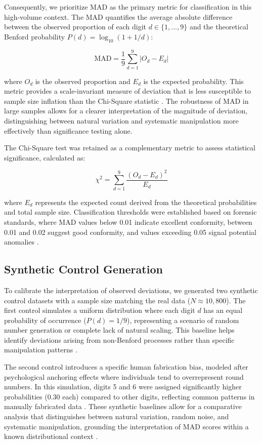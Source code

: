 \documentclass[11pt,a4paper]{article}
\begin{document}
Consequently, we prioritize MAD as the primary metric for classification in this high-volume context. The MAD quantifies the average absolute difference between the observed proportion of each digit $d \in \{1, \dots, 9\}$ and the theoretical Benford probability $P(d) = \log_{10}(1 + 1/d)$:

$$
\text{MAD} = \frac{1}{9} \sum_{d=1}^{9} |O_d - E_d|
$$

where $O_d$ is the observed proportion and $E_d$ is the expected probability. This metric provides a scale-invariant measure of deviation that is less susceptible to sample size inflation than the Chi-Square statistic \cite{Kossler2024SomeNI}. The robustness of MAD in large samples allows for a clearer interpretation of the magnitude of deviation, distinguishing between natural variation and systematic manipulation more effectively than significance testing alone.

The Chi-Square test was retained as a complementary metric to assess statistical significance, calculated as:

$$
\chi^2 = \sum_{d=1}^{9} \frac{(O_d - E_d)^2}{E_d}
$$

where $E_d$ represents the expected count derived from the theoretical probabilities and total sample size. Classification thresholds were established based on forensic standards, where MAD values below 0.01 indicate excellent conformity, between 0.01 and 0.02 suggest good conformity, and values exceeding 0.05 signal potential anomalies \cite{Druica2018BenfordsLA}.

\subsection{Synthetic Control Generation}

To calibrate the interpretation of observed deviations, we generated two synthetic control datasets with a sample size matching the real data ($N \approx 10,800$). The first control simulates a uniform distribution where each digit $d$ has an equal probability of occurrence ($P(d) = 1/9$), representing a scenario of random number generation or complete lack of natural scaling. This baseline helps identify deviations arising from non-Benford processes rather than specific manipulation patterns \cite{Ivanova2025BenfordsLA}.

The second control introduces a specific human fabrication bias, modeled after psychological anchoring effects where individuals tend to overrepresent round numbers. In this simulation, digits 5 and 6 were assigned significantly higher probabilities (0.30 each) compared to other digits, reflecting common patterns in manually fabricated data \cite{Schumm2023CanRS}. These synthetic baselines allow for a comparative analysis that distinguishes between natural variation, random noise, and systematic manipulation, grounding the interpretation of MAD scores within a known distributional context \cite{Silva2024ANA}.
\end{document}
